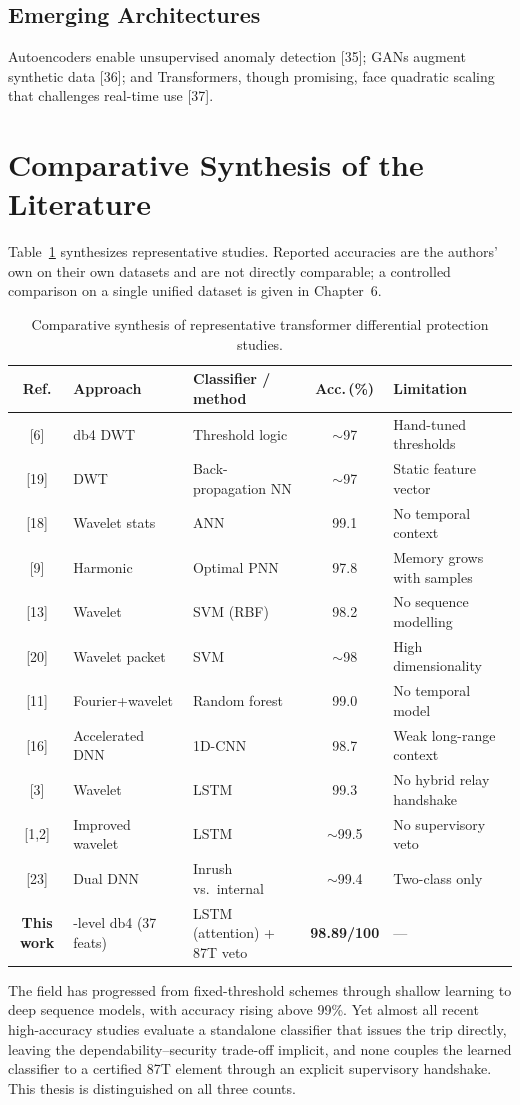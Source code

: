 \documentclass[12pt,a4paper,oneside]{report}
\begin{document}
\subsection{Emerging Architectures}
Autoencoders enable unsupervised anomaly detection [35]; GANs augment synthetic data [36]; and Transformers, though promising, face quadratic scaling that challenges real-time use [37].

\section{Comparative Synthesis of the Literature}
Table~\ref{tab:litcompare} synthesizes representative studies. Reported accuracies are the authors' own on their own datasets and are not directly comparable; a controlled comparison on a single unified dataset is given in Chapter~6.
\begin{table}[H]\centering
\caption{Comparative synthesis of representative transformer differential protection studies.}\label{tab:litcompare}
\footnotesize\setlength{\tabcolsep}{4pt}
\begin{tabular}{@{}c>{\raggedright\arraybackslash}p{2.2cm}>{\raggedright\arraybackslash}p{3.5cm}c>{\raggedright\arraybackslash}p{4.2cm}@{}}
\toprule
\textbf{Ref.} & \textbf{Approach} & \textbf{Classifier / method} & \textbf{Acc.\,(\%)} & \textbf{Limitation}\\ \midrule
{[6]} & db4 DWT & Threshold logic & $\sim$97 & Hand-tuned thresholds\\
{[19]} & DWT & Back-propagation NN & $\sim$97 & Static feature vector\\
{[18]} & Wavelet stats & ANN & 99.1 & No temporal context\\
{[9]} & Harmonic & Optimal PNN & 97.8 & Memory grows with samples\\
{[13]} & Wavelet & SVM (RBF) & 98.2 & No sequence modelling\\
{[20]} & Wavelet packet & SVM & $\sim$98 & High dimensionality\\
{[11]} & Fourier+wavelet & Random forest & 99.0 & No temporal model\\
{[16]} & Accelerated DNN & 1D-CNN & 98.7 & Weak long-range context\\
{[3]} & Wavelet & LSTM & 99.3 & No hybrid relay handshake\\
{[1,2]} & Improved wavelet & LSTM & $\sim$99.5 & No supervisory veto\\
{[23]} & Dual DNN & Inrush vs.\ internal & $\sim$99.4 & Two-class only\\
\textbf{This work} & 5-level db4 (37 feats) & LSTM (attention) + 87T veto & \textbf{98.89/100} & ---\\
\bottomrule
\end{tabular}
\end{table}
The field has progressed from fixed-threshold schemes through shallow learning to deep sequence models, with accuracy rising above 99\%. Yet almost all recent high-accuracy studies evaluate a standalone classifier that issues the trip directly, leaving the dependability--security trade-off implicit, and none couples the learned classifier to a certified 87T element through an explicit supervisory handshake. This thesis is distinguished on all three counts.
\end{document}
